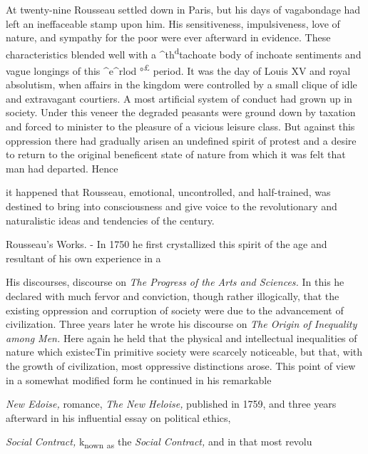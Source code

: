 \documentclass[]{book}
\begin{document}
At twenty-nine Rousseau settled down in Paris, but his days of vagabondage had left an ineffaceable stamp upon him. His sensitiveness, impulsiveness, love of nature, and sympathy for the poor were ever afterward in evidence. These characteristics blended well with a \^{}th\textsuperscript{d}tachoate body of inchoate sentiments and vague longings of this \^{}e\^{}rlod °\textsuperscript{£} period. It was the day of Louis XV and royal absolutism, when affairs in the kingdom were controlled by a small clique of idle and extravagant courtiers. A most artificial system of conduct had grown up in society. Under this veneer the degraded peasants were ground down by taxation and forced to minister to the pleasure of a vicious leisure class. But against this oppression there had gradually arisen an undefined spirit of protest and a desire to return to the original beneficent state of nature from which it was felt that man had departed. Hence

it happened that Rousseau, emotional, uncontrolled, and half-trained, was destined to bring into consciousness and give voice to the revolutionary and naturalistic ideas and tendencies of the century.

Rousseau's Works. - In 1750 he first crystallized this spirit of the age and resultant of his own experience in a

His discourses, discourse on \emph{The Progress of the Arts and Sciences.} In this he declared with much fervor and conviction, though rather illogically, that the existing oppression and corruption of society were due to the advancement of civilization. Three years later he wrote his discourse on \emph{The Origin of Inequality among Men.} Here again he held that the physical and intellectual inequalities of nature which existecTin primitive society were scarcely noticeable, but that, with the growth of civilization, most oppressive distinctions arose. This point of view in a somewhat modified form he continued in his remarkable

\emph{New Edoise,} romance, \emph{The New Heloise,} published in 1759, and three years afterward in his influential essay on political ethics,

\emph{Social Contract,} k\textsubscript{nown} \textsubscript{as} the \emph{Social Contract,} and in that most revolu
\end{document}
